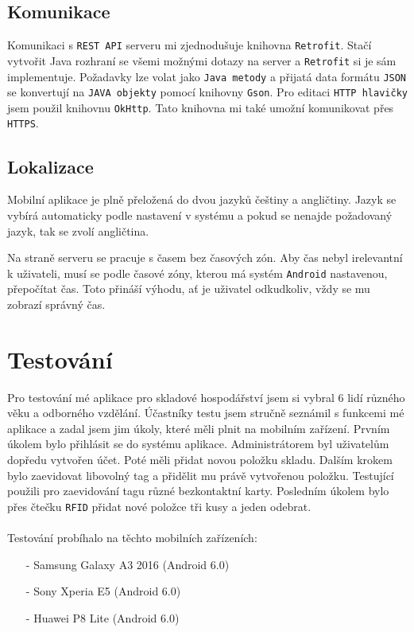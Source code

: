 \documentclass[czech,BP]{thesiskiv}
\begin{document}
\section{Komunikace}
	Komunikaci s \texttt{REST API} serveru mi zjednodušuje knihovna \texttt{Retrofit}.
	Stačí vytvořit Java rozhraní se všemi možnými dotazy na server a \texttt{Retrofit} si je sám implementuje.
	Požadavky lze volat jako \texttt{Java metody} a přijatá data formátu \texttt{JSON} se konvertují na \texttt{JAVA objekty} pomocí knihovny \texttt{Gson}. 
	Pro editaci \texttt{HTTP hlavičky} jsem použil knihovnu \texttt{OkHttp}. Tato knihovna mi také umožní komunikovat přes \texttt{HTTPS}. 


\section{Lokalizace}
Mobilní aplikace je plně přeložená do dvou jazyků češtiny a angličtiny.
Jazyk se vybírá automaticky podle nastavení v systému a pokud se nenajde požadovaný jazyk, tak se zvolí angličtina. 

Na straně serveru se pracuje s časem bez časových zón.
Aby čas nebyl irelevantní k uživateli, musí se podle časové zóny, kterou má systém \texttt{Android} nastavenou, přepočítat čas.
Toto přináší výhodu, ať je uživatel odkudkoliv, vždy se mu zobrazí správný čas.











\chapter{Testování}	
Pro testování mé aplikace pro skladové hospodářství jsem si vybral 6 lidí různého věku a odborného vzdělání. Účastníky testu jsem 
stručně seznámil s funkcemi mé aplikace a zadal jsem jim úkoly, které měli plnit na mobilním zařízení. 
Prvním úkolem bylo přihlásit se do systému aplikace. Administrátorem byl uživatelům dopředu vytvořen účet. Poté měli přidat novou položku skladu. 
Dalším krokem bylo zaevidovat libovolný tag a přidělit mu právě vytvořenou položku. 
Testující použili pro zaevidování tagu různé bezkontaktní karty.  
Posledním úkolem bylo přes čtečku \texttt{RFID} přidat nové položce tři kusy a jeden odebrat.
\\\\
Testování probíhalo na těchto mobilních zařízeních:
\begin{itemize}[noitemsep]
	\item [-] Samsung Galaxy A3 2016 (Android 6.0)
	\item [-] Sony Xperia E5 (Android 6.0)
	\item [-] Huawei P8 Lite (Android 6.0)
\end{itemize}
\end{document}
